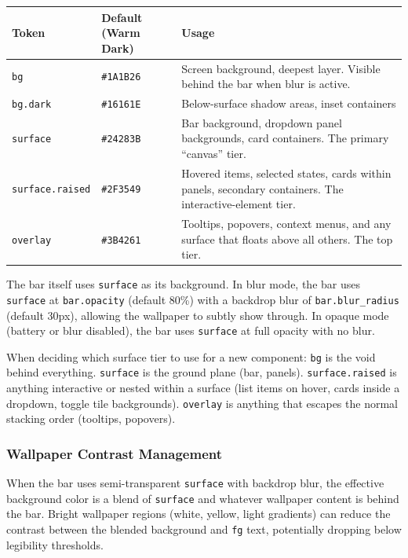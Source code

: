 \documentclass[11pt,a4paper]{article}
\begin{document}
\begin{longtable}{p{3.5cm} p{3cm} p{7cm}}
\toprule
\textbf{Token} & \textbf{Default (Warm Dark)} & \textbf{Usage} \\
\midrule
\texttt{bg} & \texttt{\#1A1B26} & Screen background, deepest layer. Visible behind the bar when blur is active. \\
\texttt{bg.dark} & \texttt{\#16161E} & Below-surface shadow areas, inset containers \\
\texttt{surface} & \texttt{\#24283B} & Bar background, dropdown panel backgrounds, card containers. The primary ``canvas'' tier. \\
\texttt{surface.raised} & \texttt{\#2F3549} & Hovered items, selected states, cards within panels, secondary containers. The interactive-element tier. \\
\texttt{overlay} & \texttt{\#3B4261} & Tooltips, popovers, context menus, and any surface that floats above all others. The top tier. \\
\bottomrule
\end{longtable}

The bar itself uses \texttt{surface} as its background. In blur mode, the bar uses \texttt{surface} at \texttt{bar.opacity} (default 80\%) with a backdrop blur of \texttt{bar.blur\_radius} (default 30px), allowing the wallpaper to subtly show through. In opaque mode (battery or blur disabled), the bar uses \texttt{surface} at full opacity with no blur.

\begin{notebox}
When deciding which surface tier to use for a new component: \texttt{bg} is the void behind everything. \texttt{surface} is the ground plane (bar, panels). \texttt{surface.raised} is anything interactive or nested within a surface (list items on hover, cards inside a dropdown, toggle tile backgrounds). \texttt{overlay} is anything that escapes the normal stacking order (tooltips, popovers).
\end{notebox}

\subsubsection{Wallpaper Contrast Management}

When the bar uses semi-transparent \texttt{surface} with backdrop blur, the effective background color is a blend of \texttt{surface} and whatever wallpaper content is behind the bar. Bright wallpaper regions (white, yellow, light gradients) can reduce the contrast between the blended background and \texttt{fg} text, potentially dropping below legibility thresholds.
\end{document}
